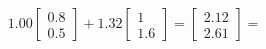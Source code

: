 \documentclass[preview]{standalone}
\begin{document}
\begin{align*}
1.00 \begin{bmatrix} 0.8 \\ 0.5 \end{bmatrix} + 1.32 \begin{bmatrix} 1 \\ 1.6 \end{bmatrix} = \begin{bmatrix} 2.12 \\ 2.61 \end{bmatrix} =
\end{align*}
\end{document}
